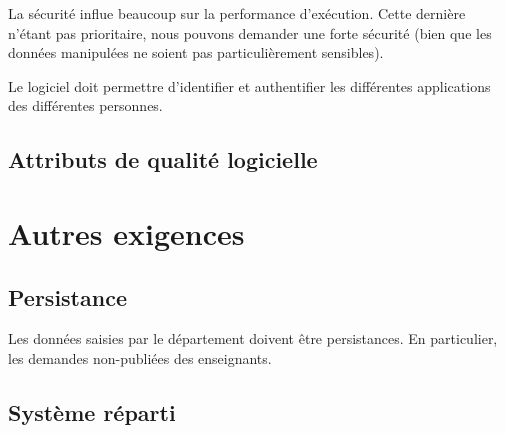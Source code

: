 La sécurité influe beaucoup sur la performance d'exécution. Cette dernière n'étant pas prioritaire, nous pouvons demander une forte sécurité (bien que les données manipulées ne soient pas particulièrement sensibles).

\begin{requirement}[Identification]
	Le logiciel doit permettre d'identifier et authentifier les différentes applications des différentes personnes.
\end{requirement}

\subsection{Attributs de qualité logicielle}
	

\section{Autres exigences}

\subsection{Persistance}

\begin{requirement}[Persistance]
	Les données saisies par le département doivent être persistances. En particulier, les demandes non-publiées des enseignants.
\end{requirement}



\subsection{Système réparti}

